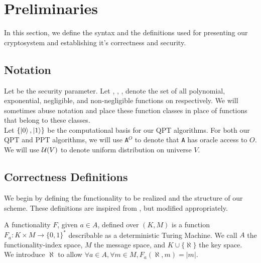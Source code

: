 \section{Preliminaries}
\label{sec:prelim}

In this section, we define the syntax and the definitions used for presenting our cryptosystem and establishing it's correctness and security.

\subsection{Notation}
\label{subsec:notation}

Let \secu be the security parameter. Let \poly, \expo, \negl, \nonegl \text{ } denote the set of all polynomial, exponential, negligible, and non-negligible functions on \secu respectively. We will sometimes abuse notation and place these function classes in place of functions that belong to these classes. \\
\noindent Let $\{ \ket{0},\ket{1} \}$ be the computational basis for our QPT algorithms. For both our QPT and PPT algorithms, we will use \texttt{A$^O$} to denote that \texttt{A} has oracle access to \texttt{$O$}. We will use $\mathcal{U}(V)$ to denote uniform distribution on universe $V$.

\subsection{Correctness Definitions}
\label{subsec:cordef}

We begin by defining the functionality to be realized and the structure of our scheme. These definitions are inspired from \cite{fe}, but modified appropriately.

\begin{definition}[Functionality]
A functionality $F$, given $a \in A$, defined over $(K,M)$ is a function $F_a: K \times M \rightarrow \{0, 1\}^*$ describable as a deterministic Turing Machine. We call $A$ the functionality-index space, $M$ the message space, and $K \cup \{ \aleph \}$ the key space. \\
We introduce $\aleph$ to allow $\forall a \in A, \forall m \in M, F_a(\aleph,m) = |m|$.
\end{definition}


